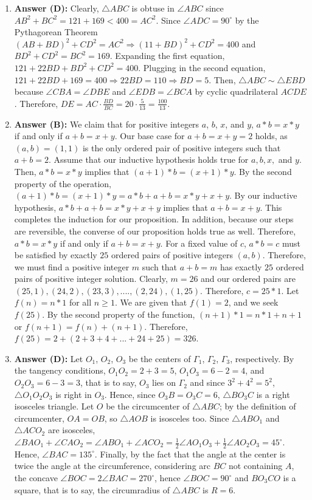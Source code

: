 \documentclass{article}
\begin{document}
\begin{enumerate}
\item \textbf{Answer (D):} Clearly, $\triangle ABC$ is obtuse in $\angle ABC$ since $AB^{2}+BC^{2}=121+169<400=AC^{2}$. Since $\angle ADC=90^{\circ}$ by the Pythagorean Theorem $(AB+BD)^{2}+CD^{2}=AC^{2}\Rightarrow(11+BD)^{2}+CD^{2}=400$ and $BD^{2}+CD^{2}=BC^{2}=169$. Expanding the first equation, $121+22BD+BD^{2}+CD^{2}=400$. Plugging in the second equation, $121+22BD+169=400\Rightarrow22BD=110\Rightarrow BD=5$. Then, $\triangle ABC \sim \triangle EBD$ because $\angle CBA=\angle DBE$ and $\angle EDB=\angle BCA$ by cyclic quadrilateral $ACDE$. Therefore, $DE=AC\cdot\frac{BD}{BC}=20\cdot\frac{5}{13}=\frac{100}{13}$.

\item \textbf{Answer (B):} We claim that for positive integers $a$, $b$, $x$, and $y$, $a*b=x*y$ if and only if $a+b=x+y$. Our base case for $a+b=x+y=2$ holds, as $(a,b)=(1,1)$ is the only ordered pair of positive integers such that $a+b=2$. Assume that our inductive hypothesis holds true for $a,b,x,$ and $y$. Then, $a*b=x*y$ implies that $(a+1)*b=(x+1)*y$. By the second property of the operation, $(a+1)*b=(x+1)*y=a*b+a+b=x*y+x+y$. By our inductive hypothesis, $a*b+a+b=x*y+x+y$ implies that $a+b=x+y$. This completes the induction for our proposition. In addition, because our steps are reversible, the converse of our proposition holds true as well. Therefore, $a*b=x*y$ if and only if $a+b=x+y$. For a fixed value of $c$, $a*b=c$ must be satisfied by exactly $25$ ordered pairs of positive integers $(a, b)$. Therefore, we must find a positive integer $m$ such that $a+b=m$ has exactly $25$ ordered pairs of positive integer solution. Clearly, $m=26$ and our ordered pairs are $(25,1), (24, 2), (23, 3), ...., (2, 24), (1, 25)$. Therefore, $c=25*1$. Let $f(n)=n*1$ for all $n\ge1$. We are given that $f(1)=2$, and we seek $f(25)$. By the second property of the function, $(n+1)*1=n*1+n+1$ or $f(n+1)=f(n)+(n+1)$. Therefore, $f(25)=2+(2+3+4+...+24+25)=326$.

\item \textbf{Answer (D):} Let $O_{1}$, $O_{2}$, $O_{3}$ be the centers of $\Gamma_{1}$, $\Gamma_{2}$, $\Gamma_{3}$, respectively. By the tangency conditions, $O_{1}O_{2}=2+3=5$, $O_{1}O_{3}=6-2=4$, and $O_{2}O_{3}=6-3=3$, that is to say, $O_{3}$ lies on $\Gamma_{2}$ and since $3^{2}+4^{2}=5^{2}$, $\triangle O_{1}O_{2}O_{3}$ is right in $O_{3}$. Hence, since $O_{3}B=O_{3}C=6$, $\triangle BO_{3}C$ is a right isosceles triangle. Let $O$ be the circumcenter of $\triangle ABC$; by the definition of circumcenter, $OA=OB$, so $\triangle AOB$ is isosceles too. Since $\triangle ABO_{1}$ and $\triangle ACO_{2}$ are isosceles, $\angle BAO_{1}+\angle CAO_{2}=\angle ABO_{1}+\angle ACO_{2}=\frac{1}{2}\angle AO_{1}O_{3}+\frac{1}{2}\angle AO_{2}O_{3}=45^{\circ}$. Hence, $\angle BAC=135^{\circ}$. Finally, by the fact that the angle at the center is twice the angle at the circumference, considering arc $BC$ not containing $A$, the concave $\angle BOC=2\angle BAC=270^{\circ}$, hence $\angle BOC=90^{\circ}$ and $BO_{3}CO$ is a square, that is to say, the circumradius of $\triangle ABC$ is $R=6$.


\end{enumerate}
\end{document}
